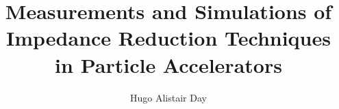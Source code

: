 \documentclass[12pt,PhD]{Thesis}
\begin{document}
%
\title{Measurements and Simulations of Impedance Reduction Techniques in Particle Accelerators}
\author{Hugo Alistair Day}


\beforeabstract
{}

\afterabstract
{}

%
\afterpreface


%
%
%



%
%
%
%
%
%
%
%
%
%
%
%
%
%
%
%
%
%
%
%
\end{document}
